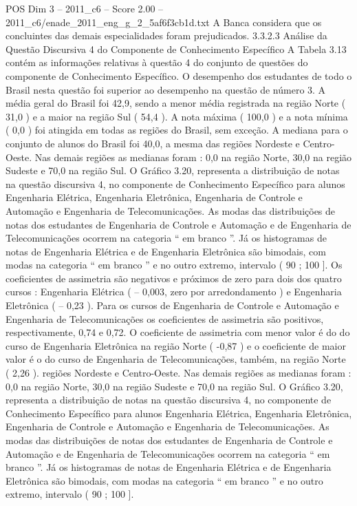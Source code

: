 \begin{textsample}{POS Dim 3 – 2011\_c6 – Score 2.00 – 2011\_c6/enade\_2011\_eng\_g\_2\_5af6f3cb1d.txt}
A Banca considera que os concluintes das demais especialidades foram prejudicados. 3.3.2.3 Análise da Questão Discursiva 4 do Componente de Conhecimento Específico A Tabela 3.13 contém as informações relativas à questão 4 do conjunto de questões do componente de Conhecimento Específico.
O desempenho dos estudantes de todo o Brasil nesta questão foi superior ao desempenho na questão de número 3.
A média geral do Brasil foi 42,9, sendo a menor média registrada na região Norte ( 31,0 ) e a maior na região Sul ( 54,4 ).
A nota máxima ( 100,0 ) e a nota mínima ( 0,0 ) foi atingida em todas as regiões do Brasil, sem exceção.
A mediana para o conjunto de alunos do Brasil foi 40,0, a mesma das regiões Nordeste e Centro-Oeste.
Nas demais regiões as medianas foram : 0,0 na região Norte, 30,0 na região Sudeste e 70,0 na região Sul.
O Gráfico 3.20, representa a distribuição de notas na questão discursiva 4, no componente de Conhecimento Específico para alunos Engenharia Elétrica, Engenharia Eletrônica, Engenharia de Controle e Automação e Engenharia de Telecomunicações.
As modas das distribuições de notas dos estudantes de Engenharia de Controle e Automação e de Engenharia de Telecomunicações ocorrem na categoria “ em branco ”.
Já os histogramas de notas de Engenharia Elétrica e de Engenharia Eletrônica são bimodais, com modas na categoria “ em branco ” e no outro extremo, intervalo ( 90 ; 100 ].
Os coeficientes de assimetria são negativos e próximos de zero para dois dos quatro cursos : Engenharia Elétrica ( – 0,003, zero por arredondamento ) e Engenharia Eletrônica ( – 0,23 ).
Para os cursos de Engenharia de Controle e Automação e Engenharia de Telecomunicações os coeficientes de assimetria são positivos, respectivamente, 0,74 e 0,72.
O coeficiente de assimetria com menor valor é do do curso de Engenharia Eletrônica na região Norte ( -0,87 ) e o coeficiente de maior valor é o do curso de Engenharia de Telecomunicações, também, na região Norte ( 2,26 ). regiões Nordeste e Centro-Oeste.
Nas demais regiões as medianas foram : 0,0 na região Norte, 30,0 na região Sudeste e 70,0 na região Sul.
O Gráfico 3.20, representa a distribuição de notas na questão discursiva 4, no componente de Conhecimento Específico para alunos Engenharia Elétrica, Engenharia Eletrônica, Engenharia de Controle e Automação e Engenharia de Telecomunicações.
As modas das distribuições de notas dos estudantes de Engenharia de Controle e Automação e de Engenharia de Telecomunicações ocorrem na categoria “ em branco ”.
Já os histogramas de notas de Engenharia Elétrica e de Engenharia Eletrônica são bimodais, com modas na categoria “ em branco ” e no outro extremo, intervalo ( 90 ; 100 ].

\end{textsample}
